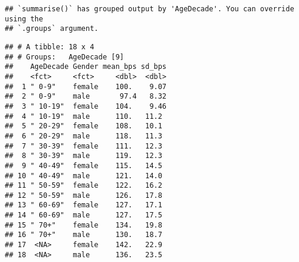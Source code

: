 \documentclass[
]{article}
\begin{document}
\begin{verbatim}
## `summarise()` has grouped output by 'AgeDecade'. You can override using the
## `.groups` argument.
\end{verbatim}

\begin{verbatim}
## # A tibble: 18 x 4
## # Groups:   AgeDecade [9]
##    AgeDecade Gender mean_bps sd_bps
##    <fct>     <fct>     <dbl>  <dbl>
##  1 " 0-9"    female    100.    9.07
##  2 " 0-9"    male       97.4   8.32
##  3 " 10-19"  female    104.    9.46
##  4 " 10-19"  male      110.   11.2 
##  5 " 20-29"  female    108.   10.1 
##  6 " 20-29"  male      118.   11.3 
##  7 " 30-39"  female    111.   12.3 
##  8 " 30-39"  male      119.   12.3 
##  9 " 40-49"  female    115.   14.5 
## 10 " 40-49"  male      121.   14.0 
## 11 " 50-59"  female    122.   16.2 
## 12 " 50-59"  male      126.   17.8 
## 13 " 60-69"  female    127.   17.1 
## 14 " 60-69"  male      127.   17.5 
## 15 " 70+"    female    134.   19.8 
## 16 " 70+"    male      130.   18.7 
## 17  <NA>     female    142.   22.9 
## 18  <NA>     male      136.   23.5
\end{verbatim}
\end{document}
